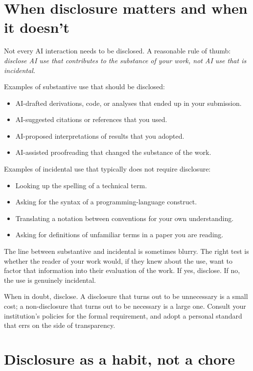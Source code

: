 \documentclass[11pt]{book}
\begin{document}
\section{When disclosure matters and when it doesn't}

Not every AI interaction needs to be disclosed. A reasonable rule of thumb: \emph{disclose AI use that contributes to the substance of your work, not AI use that is incidental.}

Examples of substantive use that should be disclosed:
\begin{itemize}\setlength{\itemsep}{1pt}
\item AI-drafted derivations, code, or analyses that ended up in your submission.
\item AI-suggested citations or references that you used.
\item AI-proposed interpretations of results that you adopted.
\item AI-assisted proofreading that changed the substance of the work.
\end{itemize}

Examples of incidental use that typically does not require disclosure:
\begin{itemize}\setlength{\itemsep}{1pt}
\item Looking up the spelling of a technical term.
\item Asking for the syntax of a programming-language construct.
\item Translating a notation between conventions for your own understanding.
\item Asking for definitions of unfamiliar terms in a paper you are reading.
\end{itemize}

The line between substantive and incidental is sometimes blurry. The right test is whether the reader of your work would, if they knew about the use, want to factor that information into their evaluation of the work. If yes, disclose. If no, the use is genuinely incidental.

When in doubt, disclose. A disclosure that turns out to be unnecessary is a small cost; a non-disclosure that turns out to be necessary is a large one. Consult your institution's policies for the formal requirement, and adopt a personal standard that errs on the side of transparency.

\section{Disclosure as a habit, not a chore}
\end{document}
